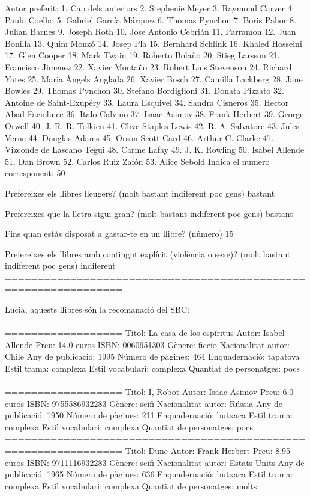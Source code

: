 Autor preferit: 
  1. Cap dels anteriors
  2. Stephenie Meyer
  3. Raymond Carver
  4. Paulo Coelho
  5. Gabriel García Márquez
  6. Thomas Pynchon
  7. Boris Pahor
  8. Julian Barnes
  9. Joseph Roth
  10. Jose Antonio Cebrián
  11. Parramon
  12. Juan Bonilla
  13. Quim Monzó
  14. Josep Pla
  15. Bernhard Schlink
  16. Khaled Hosseini
  17. Glen Cooper
  18. Mark Twain
  19. Roberto Bolaño
  20. Stieg Larsson
  21. Francisco Jimenez
  22. Xavier Montaño
  23. Robert Luis Stevenson
  24. Richard Yates
  25. Maria Àngels Anglada
  26. Xavier Bosch
  27. Camilla Lackberg
  28. Jane Bowles
  29. Thomas Pynchon
  30. Stefano Bordiglioni
  31. Donata Pizzato
  32. Antoine de Saint-Exupéry
  33. Laura Esquivel
  34. Sandra Cisneros
  35. Hector Abad Faciolince
  36. Italo Calvino
  37. Isaac Asimov
  38. Frank Herbert
  39. George Orwell
  40. J. R. R. Tolkien
  41. Clive Staples Lewis
  42. R. A. Salvatore
  43. Jules Verne
  44. Douglas Adams
  45. Orson Scott Card
  46. Arthur C. Clarke
  47. Vizconde de Lascano Tegui
  48. Carme Lafay
  49. J. K. Rowling
  50. Isabel Allende
  51. Dan Brown
  52. Carlos Ruiz Zafón
  53. Alice Sebold
Indica el numero corresponent: 50

Prefereixes els llibres lleugers? (molt bastant indiferent poc gens) bastant

Prefereixes que la lletra sigui gran? (molt bastant indiferent poc gens) bastant

Fins quan estàs disposat a gastar-te en un llibre? (número) 15

Prefereixes els llibres amb contingut explícit (violència o sexe)? (molt bastant indiferent poc gens) indiferent
================================================================

Lucia, 
aquests llibres són la recomanació del SBC: 
================================================================
Titol:                   La casa de los espíritus
Autor:                   Isabel Allende
Preu:                    14.0 euros
ISBN:                    0060951303
Gènere:                  ficcio
Nacionalitat autor:      Chile
Any de publicació:       1995
Número de pàgines:       464
Enquadernació:           tapatova
Estil trama:             complexa
Estil vocabulari:        complexa
Quantiat de personatges: pocs
================================================================
Titol:                   I, Robot
Autor:                   Isaac Asimov
Preu:                    6.0 euros
ISBN:                    9755586932283
Gènere:                  scifi
Nacionalitat autor:      Rússia
Any de publicació:       1950
Número de pàgines:       211
Enquadernació:           butxaca
Estil trama:             complexa
Estil vocabulari:        complexa
Quantiat de personatges: pocs
================================================================
Titol:                   Dune
Autor:                   Frank Herbert
Preu:                    8.95 euros
ISBN:                    9711116932283
Gènere:                  scifi
Nacionalitat autor:      Estats Units
Any de publicació:       1965
Número de pàgines:       636
Enquadernació:           butxaca
Estil trama:             complexa
Estil vocabulari:        complexa
Quantiat de personatges: molts

